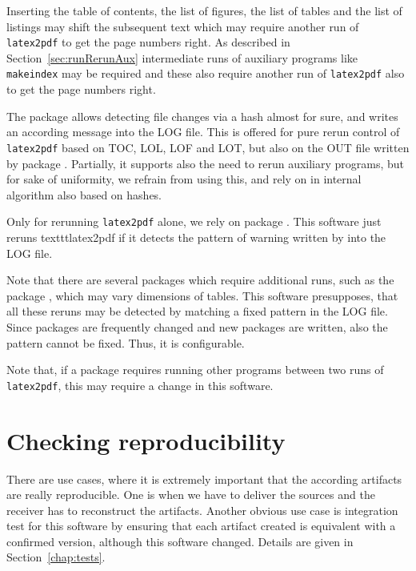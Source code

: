 Inserting the table of contents,
the list of figures, the list of tables and the list of listings 
may shift the subsequent text 
which may require another run of \texttt{latex2pdf} 
to get the page numbers right. 
As described in Section~\ref{sec:runRerunAux} 
intermediate runs of auxiliary programs like \texttt{makeindex} 
may be required 
and these also require another run of \texttt{latex2pdf} 
also to get the page numbers right. 

The package  allows detecting file changes via a hash 
almost for sure, and writes an according message into the LOG file. 
This is offered for pure rerun control of \texttt{latex2pdf} 
based on TOC, LOL, LOF and LOT, but also on the OUT file written by package . 
Partially, it supports also the need to rerun auxiliary programs, 
but for sake of uniformity, we refrain from using this, 
and rely on in internal algorithm also based on hashes. 

Only for rerunning \texttt{latex2pdf} alone, we rely on package . 
This software just reruns texttt{latex2pdf} 
if it detects the pattern of warning written by  into the LOG file. 



Note that there are several packages which require additional runs, 
such as the package , 
which may vary dimensions of tables. 
This software presupposes, that all these reruns 
may be detected by matching a fixed pattern in the LOG file. 
Since packages are frequently changed and new packages are written, 
also the pattern cannot be fixed. 
Thus, it is configurable. 
 
Note that, if a package requires running other programs 
between two runs of \texttt{latex2pdf}, 
this may require a change in this software. 

\section{Checking reproducibility}\label{sec:chkReprod}

There are use cases, where it is extremely important 
that the according artifacts are really reproducible. 
One is when we have to deliver the sources 
and the receiver has to reconstruct the artifacts. 
Another obvious use case is integration test for this software 
by ensuring that each artifact created 
is equivalent with a confirmed version, 
although this software changed. 
Details are given in Section~\ref{chap:tests}. 


